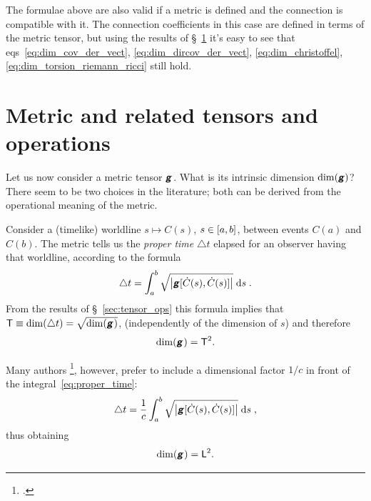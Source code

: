 \documentclass[\ifafour a4paper,12pt,\else a5paper,10pt,\fi%
onecolumn,oneside,article,%
british%
]{memoir}
\makeatletter
\theoremstyle{remark}
\theoremstyle{innote}
\newcommand*{\mathte}[1]{\textbf{\textit{\textsf{#1}}}}
\newcommand*{\citep}{\footcites}
\newcommand*{\di}{\mathrm{d}}%
\newcommand*{\incr}{\triangle}%
\DeclarePairedDelimiter\clcl{[}{]}
\DeclarePairedDelimiter\abs{\lvert}{\rvert}
\renewcommand*{\|}[1][]{\nonscript\,#1\vert\nonscript\;\mathopen{}}
\newcommand*{\sect}{\S}%
\newcommand*{\chap}{ch.}%
\newcommand*{\eqn}{eq.}%
\newcommand*{\eqns}{eqs}%
\newcommand*{\eg}{{e.g.}}
\newcommand*{\q}{}%
\DeclareRobustCommand*{\q}{%
  \mathbin{\mathpalette\bigcdot@{}}%
}
\newcommand*{\bigcdot@scalefactor}{0.7}
\newcommand*{\bigcdot@widthfactor}{1.5}
\newcommand*{\bigcdot@}[2]{%
  \sbox0{$#1\vcenter{}$}%
  \sbox2{$#1\cdot\m@th$}%
  \hbox to \bigcdot@widthfactor\wd2{%
    \hfil
    \raise\ht0\hbox{%
      \scalebox{\bigcdot@scalefactor}{%
        \lower\ht0\hbox{$#1\bullet\m@th$}%
      }%
    }%
    \hfil
  }%
}
\newcommand*{\Le}{\textsf{L}}
\newcommand*{\Ti}{\textsf{T}}
\newcommand*{\yg}{\mathte{g}}
\newcommand*{\ygc}{\mathte{g}}
\renewcommand*{\i}{\indices}
\newcommand*{\inct}{\incr t}
\makeatother
\begin{document}
\medskip

The formulae above are also valid if a metric is defined and the connection
is compatible with it. The connection coefficients in this case are defined
in terms of the metric tensor, but using the results of
\sect~\ref{sec:metric} it's easy to see that
\eqns~\eqref{eq:dim_cov_der_vect}, \eqref{eq:dim_dircov_der_vect},
\eqref{eq:dim_christoffel}, \eqref{eq:dim_torsion_riemann_ricci} still
hold.


\section{Metric and related tensors and operations}
\label{sec:metric}

Let us now consider a metric tensor $\yg\i{_{\q\q}}$. What is its intrinsic
dimension $\dim(\yg)$? There seem to be two choices in the literature; both
can be derived from the operational meaning of the metric.


Consider a (timelike) worldline $s \mapsto C(s)$, $s\in \clcl{a,b}$,
between events $C(a)$ and $C(b)$. The metric tells us the \emph{proper
  time} $\inct$ elapsed for an observer having that worldline, according to
the formula
\begin{equation}%
  \label{eq:proper_time}
\inct =  \int_a^b
\sqrt{\abs*{\yg[\dot{C}(s),\dot{C}(s)]}} \; \di s\;.
\end{equation}
From the results of \sect~\ref{sec:tensor_ops} this formula implies that
 $\Ti \equiv \dim(\inct) = \sqrt{\dim(\yg\i{_{\q\q}})}$,
(independently of the dimension of $s$) and therefore
\begin{equation}%
    \label{eq:dim_g}
    \dim(\yg\i{_{\q\q}}) = \Ti^{2}.
  \end{equation}

  Many authors \citep[\eg][\sect~V.62
  \eqn~(62.02)]{fock1955_t1964}[\chap~11
  \eqn~(11.21)]{curtisetal1985}[\sect~5.3
  \eqn~(5.6)]{rindler1969_r1986}[\chap~6 \eqn~(6.24)]{hartle2003}, however,
  prefer to include a dimensional factor $1/c$ in front of the
  integral~\eqref{eq:proper_time}:
\begin{equation}%
  \label{eq:proper_time_c}
  \inct = \frac{1}{c} \int_a^b
  \sqrt{\abs*{\ygc[\dot{C}(s),\dot{C}(s)]}} \;\di s\;,
\end{equation}
thus obtaining
\begin{equation}%
  \label{eq:dim_g_c}
  \dim(\ygc\i{_{\q\q}}) = \Le^{2}.
\end{equation}
\end{document}
